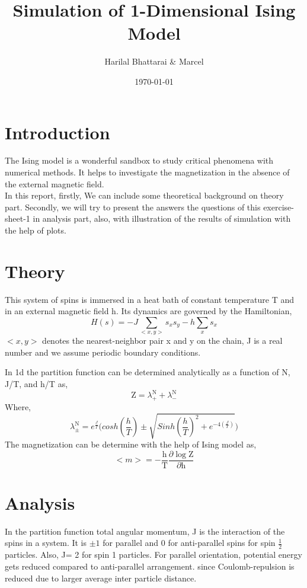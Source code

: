 \documentclass[11pt, a4paper, DIV=12]{scrartcl}
\title{Simulation of 1-Dimensional Ising Model}
\date{\today}
\author{Harilal Bhattarai \& Marcel}
\begin{document}
	\maketitle
	
\section{Introduction}
The Ising model is a wonderful sandbox to study critical phenomena with numerical methods. It helps to investigate the magnetization in the absence of the external magnetic field.\\

In this report, firstly, We can include some theoretical background on theory part. Secondly, we will try to present the answers the questions of this exercise-sheet-1 in analysis part, also, with illustration of the results of simulation with the help of plots.  

\section{Theory}

This system of spins is immersed in a heat bath of constant temperature T and in an external magnetic field h. Its dynamics are governed by the Hamiltonian,
\begin{equation}
H(s)= -J \sum_{<x,y>}s_{x}s_{y} - h \sum_{x}s_{x}
\end{equation}
$ <x,y> $ denotes the nearest-neighbor pair x and y on the chain, J is a real number and we assume periodic boundary conditions.

In 1d the partition function can be determined analytically as a function of N, J/T, and h/T as,
\begin{equation}
\text{Z}=\lambda^{\text{N}}_{+} + \lambda^{\text{N}}_{-}
\end{equation}
Where, 
\begin{equation}
 \lambda^{\text{N}}_{\pm}= e^{\frac{J}{T}} \bigg(cosh(\frac{h}{T})\pm \sqrt{Sinh(\frac{h}{T})^2 + e^{-4(\frac{J}{T})}} \bigg) 
 \label{Equ:lambda}
	\end{equation}
The magnetization can be determine with the help of Ising model as, 
\begin{equation}
<m> = -\frac{\text{h}}{\text{T}} \frac{\partial\log \text{Z}}{\partial \text{h}}
\label{equ:m}
\end{equation}  

\section{Analysis}
In the partition function total angular momentum, J is the interaction of the spins in a system. It is $ \pm 1 $ for parallel and 0 for 
anti-parallel spins for spin $ \frac{1}{2} $ particles. Also, J= 2 for spin 1 particles. For parallel orientation, potential energy gets reduced compared to anti-parallel arrangement. since Coulomb-repulsion is reduced
due to larger average inter particle distance.\\
\end{document}
